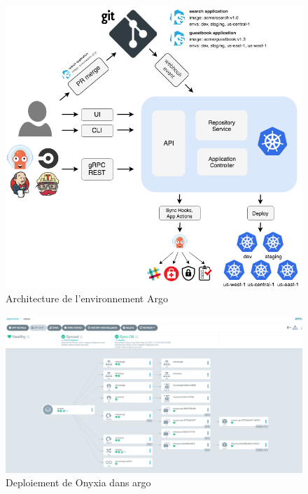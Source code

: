 \documentclass[11pt,fleqn]{book} %
\begin{document}
\begin{figure}[H]\centering
\renewcommand{\figurename}{Graphique}
\hspace{-1cm}
\includegraphics[scale=0.4]{Pictures/CI-CD/argocd_architecture.png}
\captionsetup{margin=1.5cm,format=hang,justification=justified}
\caption[]{Architecture de l'environnement Argo \newline}
\end{figure}


\begin{figure}[H]
\renewcommand{\figurename}{Graphique}
\hspace{-2.5cm}\includegraphics[scale=0.5,trim={0 0 5cm 0},clip]{Pictures/CI-CD/Onyxia-argo.PNG}
\captionsetup{margin=1.5cm,format=hang,justification=justified}
\caption[]{Deploiement de Onyxia dans argo \newline}
\end{figure}
 
\end{document}
